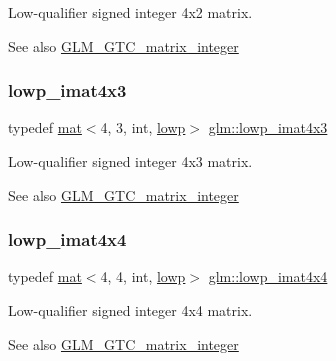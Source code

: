 Low-\/qualifier signed integer 4x2 matrix. \begin{DoxySeeAlso}{See also}
\mbox{\hyperlink{group__gtc__matrix__integer}{G\+L\+M\+\_\+\+G\+T\+C\+\_\+matrix\+\_\+integer}} 
\end{DoxySeeAlso}
\mbox{\label{group__gtc__matrix__integer_gad4b823d8b8ba89d8d6baa562ffb97751}} 
\subsubsection{\texorpdfstring{lowp\+\_\+imat4x3}{lowp\_imat4x3}}
{\footnotesize\ttfamily typedef \mbox{\hyperlink{structglm_1_1mat}{mat}}$<$4, 3, int, \mbox{\hyperlink{namespaceglm_a36ed105b07c7746804d7fdc7cc90ff25ae161af3fc695e696ce3bf69f7332bc2d}{lowp}}$>$ \mbox{\hyperlink{group__gtc__matrix__integer_gad4b823d8b8ba89d8d6baa562ffb97751}{glm\+::lowp\+\_\+imat4x3}}}

Low-\/qualifier signed integer 4x3 matrix. \begin{DoxySeeAlso}{See also}
\mbox{\hyperlink{group__gtc__matrix__integer}{G\+L\+M\+\_\+\+G\+T\+C\+\_\+matrix\+\_\+integer}} 
\end{DoxySeeAlso}
\mbox{\label{group__gtc__matrix__integer_ga788e6fa0d6ba756ae9fc758099c57f85}} 
\subsubsection{\texorpdfstring{lowp\+\_\+imat4x4}{lowp\_imat4x4}}
{\footnotesize\ttfamily typedef \mbox{\hyperlink{structglm_1_1mat}{mat}}$<$4, 4, int, \mbox{\hyperlink{namespaceglm_a36ed105b07c7746804d7fdc7cc90ff25ae161af3fc695e696ce3bf69f7332bc2d}{lowp}}$>$ \mbox{\hyperlink{group__gtc__matrix__integer_ga788e6fa0d6ba756ae9fc758099c57f85}{glm\+::lowp\+\_\+imat4x4}}}

Low-\/qualifier signed integer 4x4 matrix. \begin{DoxySeeAlso}{See also}
\mbox{\hyperlink{group__gtc__matrix__integer}{G\+L\+M\+\_\+\+G\+T\+C\+\_\+matrix\+\_\+integer}} 
\end{DoxySeeAlso}
\mbox{\label{group__gtc__matrix__integer_ga51cca2e9b98db6345e8c60b7d00c79cf}} 
